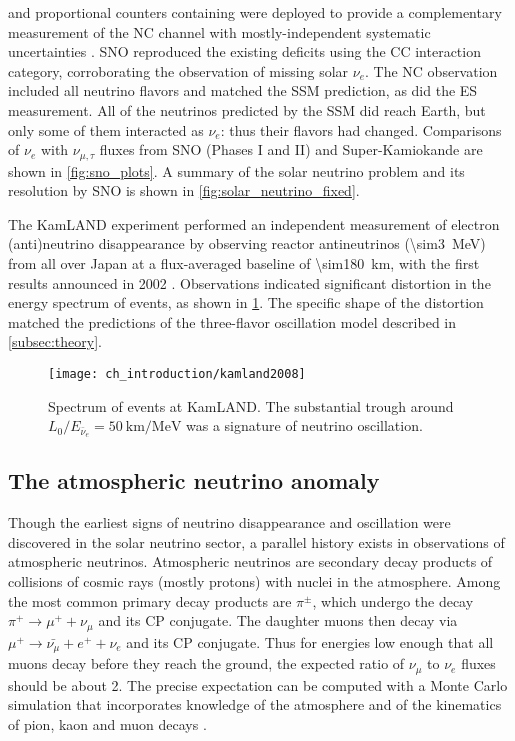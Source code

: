 and proportional counters containing 
were deployed to provide a complementary measurement of the NC channel
with mostly-independent systematic uncertainties \cite{sno_ncd_instrumentation}.
SNO reproduced the existing deficits using the CC interaction category,
corroborating the observation of missing solar $\nu_e$.
The NC observation included all neutrino flavors and matched the SSM prediction,
as did the ES measurement.
All of the neutrinos predicted by the SSM did reach Earth,
but only some of them interacted as $\nu_e$: thus their flavors had changed.
Comparisons of $\nu_e$ with $\nu_{\mu,\tau}$ fluxes
from SNO (Phases I and II) and Super-Kamiokande are shown in \cref{fig:sno_plots}.
A summary of the solar neutrino problem and its resolution by SNO
is shown in \cref{fig:solar_neutrino_fixed}.

The KamLAND experiment performed
an independent measurement of electron (anti)\-neutrino disappearance
by observing reactor antineutrinos (\SI{\sim3}{\MeV}) from all over Japan
at a flux-averaged baseline of \SI{\sim180}{\km},
with the first results announced in 2002 \cite{kamland_first}.
Observations indicated significant distortion
in the energy spectrum of \nuebar{} events,
as shown in \cref{fig:kamland_spec}.
The specific shape of the distortion
matched the predictions of the three-flavor oscillation model
described in \cref{subsec:theory}.

\begin{figure}
    \centering
    \texttt{[image: ch\_introduction/kamland2008]}
    \caption[KamLAND oscillation spectrum]{
        Spectrum of \nuebar{} events at KamLAND.
        The substantial trough around $L_0/E_{\bar{\nu}_e} = \SI{50}{\km\per\MeV}$
        was a signature of neutrino oscillation.
    }
    \label{fig:kamland_spec}
\end{figure}

\subsection{The atmospheric neutrino anomaly}
\label{subsec:atmospheric_anomaly}

Though the earliest signs of neutrino disappearance and oscillation
were discovered in the solar neutrino sector,
a parallel history exists in observations of atmospheric neutrinos.
Atmospheric neutrinos are secondary decay products of
collisions of cosmic rays (mostly protons) with nuclei in the atmosphere.
Among the most common primary decay products are $\pi^{\pm}$,
which undergo the decay $\pi^+ \to \mu^+ + \nu_\mu$ and its CP conjugate.
The daughter muons then decay via $\mu^+ \to \bar{\nu_\mu} + e^+ + \nu_e$
and its CP conjugate.
Thus for energies low enough that all muons decay before they reach the ground,
the expected ratio of $\nu_\mu$ to $\nu_e$ fluxes should be about 2.
The precise expectation can be computed with a Monte Carlo simulation
that incorporates knowledge of the atmosphere and of the kinematics of
pion, kaon and muon decays \cite{neutrino_textbook}.

